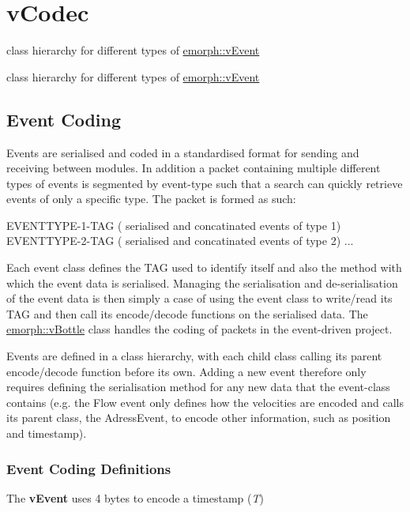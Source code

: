 \hypertarget{group__vCodec}{\section{v\-Codec}
\label{group__vCodec}
}


class hierarchy for different types of \hyperlink{classemorph_1_1vEvent}{emorph\-::v\-Event}  


class hierarchy for different types of \hyperlink{classemorph_1_1vEvent}{emorph\-::v\-Event} \subsection*{Event Coding }

Events are serialised and coded in a standardised format for sending and receiving between modules. In addition a packet containing multiple different types of events is segmented by event-\/type such that a search can quickly retrieve events of only a specific type. The packet is formed as such\-: \begin{DoxyVerb}EVENTTYPE-1-TAG ( serialised and concatinated events of type 1) EVENTTYPE-2-TAG ( serialised and concatinated events of type 2) ...
\end{DoxyVerb}


Each event class defines the T\-A\-G used to identify itself and also the method with which the event data is serialised. Managing the serialisation and de-\/serialisation of the event data is then simply a case of using the event class to write/read its T\-A\-G and then call its encode/decode functions on the serialised data. The \hyperlink{classemorph_1_1vBottle}{emorph\-::v\-Bottle} class handles the coding of packets in the event-\/driven project.

Events are defined in a class hierarchy, with each child class calling its parent encode/decode function before its own. Adding a new event therefore only requires defining the serialisation method for any new data that the event-\/class contains (e.\-g. the Flow event only defines how the velocities are encoded and calls its parent class, the Adress\-Event, to encode other information, such as position and timestamp).

 \subsubsection*{Event Coding Definitions }

The {\bfseries v\-Event} uses 4 bytes to encode a timestamp ({\itshape T}) \begin{DoxyVerb}
\end{DoxyVerb}


